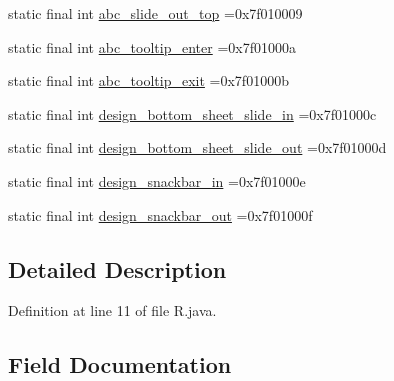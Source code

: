 \begin{DoxyCompactItemize}
\item 
static final int \mbox{\hyperlink{classcom_1_1example_1_1trainawearapplication_1_1_r_1_1anim_af8e4e1a3d044fbd0a32e936219b9380d}{abc\+\_\+slide\+\_\+out\+\_\+top}} =0x7f010009
\item 
static final int \mbox{\hyperlink{classcom_1_1example_1_1trainawearapplication_1_1_r_1_1anim_aec421bde134debbb818cf5ff2df4a442}{abc\+\_\+tooltip\+\_\+enter}} =0x7f01000a
\item 
static final int \mbox{\hyperlink{classcom_1_1example_1_1trainawearapplication_1_1_r_1_1anim_ad39ffc769632a1c60586a5b2f7322712}{abc\+\_\+tooltip\+\_\+exit}} =0x7f01000b
\item 
static final int \mbox{\hyperlink{classcom_1_1example_1_1trainawearapplication_1_1_r_1_1anim_a669156f834a6285fe184883eca2f041f}{design\+\_\+bottom\+\_\+sheet\+\_\+slide\+\_\+in}} =0x7f01000c
\item 
static final int \mbox{\hyperlink{classcom_1_1example_1_1trainawearapplication_1_1_r_1_1anim_aefca780e3dbbc5d0983fb3c7ba56c828}{design\+\_\+bottom\+\_\+sheet\+\_\+slide\+\_\+out}} =0x7f01000d
\item 
static final int \mbox{\hyperlink{classcom_1_1example_1_1trainawearapplication_1_1_r_1_1anim_a7bbe993b9793070697299db359462fb1}{design\+\_\+snackbar\+\_\+in}} =0x7f01000e
\item 
static final int \mbox{\hyperlink{classcom_1_1example_1_1trainawearapplication_1_1_r_1_1anim_a29a52a55097166be9a63844e48c44256}{design\+\_\+snackbar\+\_\+out}} =0x7f01000f
\end{DoxyCompactItemize}


\subsection{Detailed Description}


Definition at line 11 of file R.\+java.



\subsection{Field Documentation}
\mbox{\label{classcom_1_1example_1_1trainawearapplication_1_1_r_1_1anim_a82e75f30f76bfd5491b27925c496aac5}} 
